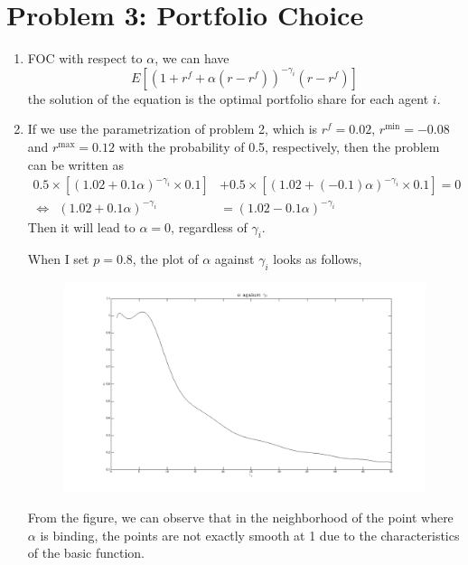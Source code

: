 \section*{Problem 3: Portfolio Choice}
\begin{enumerate}
\item
FOC with respect to $\alpha$, we can have 
$$E\left[\left(1+r^{f}+\alpha(r-r^{f})\right)^{-\gamma_{i}}(r-r^{f})\right]$$
the solution of the equation is the optimal portfolio share for each agent $i$.
\item

If we use the parametrization of problem 2, which is $r^{f}=0.02$, $r^{\text{min}}=-0.08$ and $r^{\text{max}}=0.12$ with the probability of 0.5, respectively, then the problem can be written as 
\begin{align*}
0.5\times\left[(1.02+0.1\alpha)^{-\gamma_{i}}\times0.1\right]&+0.5\times\left[(1.02+(-0.1)\alpha)^{-\gamma_{i}}\times0.1\right]=0\\
\Leftrightarrow ~~(1.02+0.1\alpha)^{-\gamma_{i}}&=(1.02-0.1\alpha)^{-\gamma_{i}}
\end{align*}
Then it will lead to $\alpha=0$, regardless of $\gamma_{i}$.

When I set $p=0.8$, the plot of $\alpha$ against $\gamma_{i}$ looks as follows,
\begin{figure}[htbp]
\centering
\includegraphics[width=\linewidth]{Figure/Q3.png}
\end{figure}
From the figure, we can observe that in the neighborhood of the point where $\alpha$ is binding, the points are not exactly smooth at 1 due to the characteristics of the basic function.


\end{enumerate}
